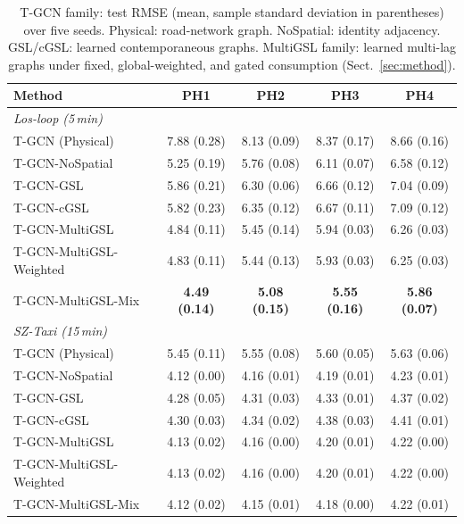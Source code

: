 \begin{table}[t]
\centering
\caption{T-GCN family: test RMSE (mean, sample standard deviation in
parentheses) over five seeds. Physical: road-network graph.
NoSpatial: identity adjacency. GSL/cGSL: learned contemporaneous graphs.
MultiGSL family: learned multi-lag graphs under fixed, global-weighted, and
gated consumption (Sect.~\ref{sec:method}).}
\label{tab:tgcn-main}
\small
\begin{tabular}{lcccc}
\toprule
Method & PH1 & PH2 & PH3 & PH4 \\
\midrule
\multicolumn{5}{l}{\textit{Los-loop (5\,min)}} \\
T-GCN (Physical) & 7.88 (0.28) & 8.13 (0.09) & 8.37 (0.17) & 8.66 (0.16) \\
T-GCN-NoSpatial & 5.25 (0.19) & 5.76 (0.08) & 6.11 (0.07) & 6.58 (0.12) \\
T-GCN-GSL & 5.86 (0.21) & 6.30 (0.06) & 6.66 (0.12) & 7.04 (0.09) \\
T-GCN-cGSL & 5.82 (0.23) & 6.35 (0.12) & 6.67 (0.11) & 7.09 (0.12) \\
T-GCN-MultiGSL & 4.84 (0.11) & 5.45 (0.14) & 5.94 (0.03) & 6.26 (0.03) \\
T-GCN-MultiGSL-Weighted & 4.83 (0.11) & 5.44 (0.13) & 5.93 (0.03) & 6.25 (0.03) \\
T-GCN-MultiGSL-Mix & \textbf{4.49 (0.14)} & \textbf{5.08 (0.15)} & \textbf{5.55 (0.16)} & \textbf{5.86 (0.07)} \\
\midrule
\multicolumn{5}{l}{\textit{SZ-Taxi (15\,min)}} \\
T-GCN (Physical) & 5.45 (0.11) & 5.55 (0.08) & 5.60 (0.05) & 5.63 (0.06) \\
T-GCN-NoSpatial & 4.12 (0.00) & 4.16 (0.01) & 4.19 (0.01) & 4.23 (0.01) \\
T-GCN-GSL & 4.28 (0.05) & 4.31 (0.03) & 4.33 (0.01) & 4.37 (0.02) \\
T-GCN-cGSL & 4.30 (0.03) & 4.34 (0.02) & 4.38 (0.03) & 4.41 (0.01) \\
T-GCN-MultiGSL & 4.13 (0.02) & 4.16 (0.00) & 4.20 (0.01) & 4.22 (0.00) \\
T-GCN-MultiGSL-Weighted & 4.13 (0.02) & 4.16 (0.00) & 4.20 (0.01) & 4.22 (0.00) \\
T-GCN-MultiGSL-Mix & 4.12 (0.02) & 4.15 (0.01) & 4.18 (0.00) & 4.22 (0.01) \\
\bottomrule
\end{tabular}
\end{table}

